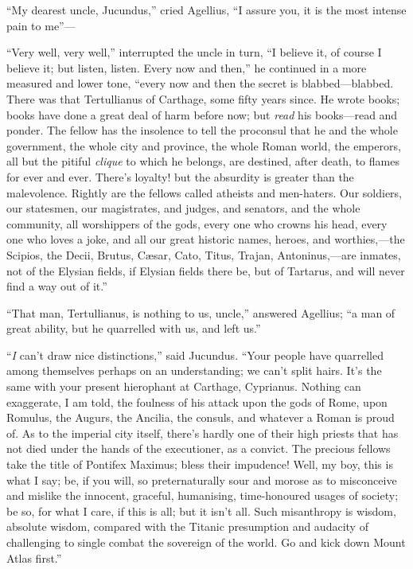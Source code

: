 ``My dearest uncle, Jucundus,'' cried Agellius, ``I
assure you, it is the most intense pain to me''—

``Very well, very well,'' interrupted the uncle in turn,
``I believe it, of course I believe it; but listen, listen. Every
now and then,'' he continued in a more measured and lower tone,
``every now and then the secret is blabbed—blabbed. There was
that Tertullianus of Carthage, some fifty years since. He wrote books;
books have done a great deal of harm before now; but \emph{read}
his books—read and ponder. The fellow has the insolence to tell the
proconsul that he and the whole government, the whole city and
province, the whole Roman world, the emperors, all but the pitiful \emph{clique}
to which he belongs, are destined, after death, to flames for ever and
ever. There's loyalty! but the absurdity is greater than the
malevolence. Rightly are the fellows called atheists and men-haters.
Our soldiers, our statesmen, our magistrates, and judges, and
senators, and the whole community, all worshippers of the gods, every
one who crowns his head, every one who loves a joke, and all our great
historic names, heroes, and worthies,—the Scipios, the Decii,
Brutus, Cæsar, Cato, Titus, Trajan, Antoninus,—are inmates, not of
the Elysian fields, if Elysian fields there be, but of Tartarus, and
will never find a way out of it.''

``That man, Tertullianus, is nothing to us, uncle,''
answered Agellius; ``a man of great ability, but he quarrelled
with us, and left us.''

``\emph{I} can't draw nice distinctions,'' said Jucundus.
``Your people have quarrelled among themselves perhaps on an
understanding; we can't split hairs. It's the same with your present
hierophant at Carthage, Cyprianus. Nothing can exaggerate, I am told,
the foulness of his attack upon the gods of Rome, upon Romulus, the
Augurs, the Ancilia, the consuls, and whatever a Roman is proud of. As
to the imperial city itself, there's hardly one of their high priests
that has not died under the hands of the executioner, as a convict. The precious fellows take the title of Pontifex Maximus;
bless their impudence! Well, my boy, this is what I say; be, if you
will, so preternaturally sour and morose as to misconceive and mislike
the innocent, graceful, humanising, time-honoured usages of society;
be so, for what I care, if this is all; but it isn't all. Such
misanthropy is wisdom, absolute wisdom, compared with the Titanic
presumption and audacity of challenging to single combat the sovereign
of the world. Go and kick down Mount Atlas first.''

